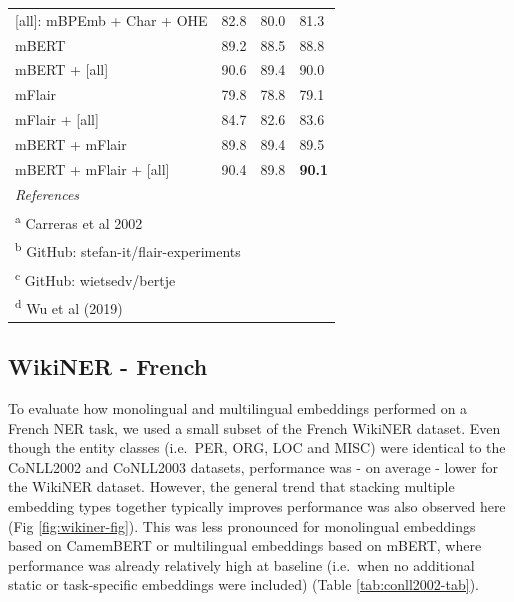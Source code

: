 \documentclass[12pt,a4paper,]{book}
\begin{document}
\begin{table}
\begin{tabular}[t]{llll}
\hspace{1em}[all]: mBPEmb + Char + OHE & 82.8 & 80.0 & 81.3\\
\hspace{1em}mBERT & 89.2 & 88.5 & 88.8\\
\hspace{1em}mBERT + [all] & 90.6 & 89.4 & 90.0\\
\hspace{1em}mFlair & 79.8 & 78.8 & 79.1\\
\hspace{1em}mFlair + [all] & 84.7 & 82.6 & 83.6\\
\hspace{1em}mBERT + mFlair & 89.8 & 89.4 & 89.5\\
\hspace{1em}mBERT + mFlair + [all] & 90.4 & 89.8 & \textbf{90.1}\\
\bottomrule
\multicolumn{4}{l}{\textit{References}}\\
\multicolumn{4}{l}{\textsuperscript{a} Carreras et al 2002}\\
\multicolumn{4}{l}{\textsuperscript{b} GitHub: stefan-it/flair-experiments}\\
\multicolumn{4}{l}{\textsuperscript{c} GitHub: wietsedv/bertje}\\
\multicolumn{4}{l}{\textsuperscript{d} Wu et al (2019)}\\
\end{tabular}
\end{table}



\hypertarget{wikiner---french}{%
\subsection{WikiNER - French}\label{wikiner---french}}

To evaluate how monolingual and multilingual embeddings performed on a French NER task, we used a small subset of the French WikiNER dataset. Even though the entity classes (i.e.~PER, ORG, LOC and MISC) were identical to the CoNLL2002 and CoNLL2003 datasets, performance was - on average - lower for the WikiNER dataset. However, the general trend that stacking multiple embedding types together typically improves performance was also observed here (Fig \ref{fig:wikiner-fig}). This was less pronounced for monolingual embeddings based on CamemBERT or multilingual embeddings based on mBERT, where performance was already relatively high at baseline (i.e.~when no additional static or task-specific embeddings were included) (Table \ref{tab:conll2002-tab}).
\end{document}
